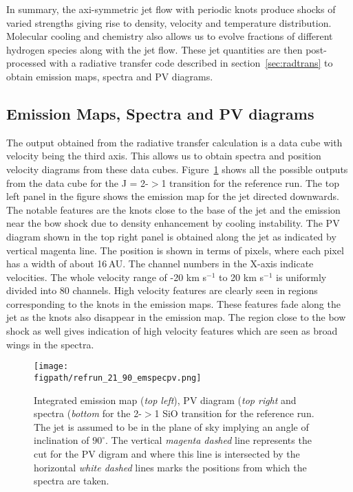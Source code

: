 \documentclass[useAMS,usenatbib]{mn2e}
\newcommand{\figpath}{PFIGS/}
\begin{document}
In summary, the axi-symmetric jet flow with periodic knots 
produce shocks of varied strengths giving rise to density, velocity and
temperature distribution. Molecular cooling and chemistry also 
allows us to evolve fractions of different hydrogen species along with the jet
flow. These jet quantities are then post-processed with a radiative
transfer code described in section~\ref{sec:radtrans} to obtain emission maps,
spectra and PV diagrams.



\subsection{Emission Maps, Spectra and PV diagrams}
\label{ssec:emspecpv}
The output obtained from the radiative transfer calculation is a data
cube with velocity being the third axis. This allows us to obtain
spectra and position velocity diagrams from these data cubes. 
Figure~\ref{empvspec90} shows all the possible outputs from the data
cube for the J = 2-$>$1 transition for the reference run. 
The top left panel in the figure shows the emission map for the jet
directed downwards. The notable features are the knots close to the
base of the jet and the emission near the bow shock due to density
enhancement by cooling instability. The PV diagram shown in the top
right panel is obtained along the jet as indicated by vertical magenta
line. The position is shown in terms of pixels, where each pixel has a
width of about 16\,AU. The channel numbers in the X-axis indicate
velocities. The whole velocity range of -20 km s$^{-1}$ to 20 km
s$^{-1}$ is uniformly divided into 80 channels. High velocity features
are clearly seen in regions corresponding to the knots in the emission
maps. These features fade along the jet as the knots also disappear in
the emission map. The region close to the bow shock as well gives
indication of high velocity features which are seen as broad wings in
the spectra. 
%

\begin{figure}
 \texttt{[image: \\figpath/refrun\_21\_90\_emspecpv.png]}
 \caption{Integrated emission map ({\it top left}), PV diagram ({\it top right}
   and spectra ({\it bottom} for the
   2-$>$1 SiO transition for the reference run. 
   The jet is assumed to be in the plane of sky implying an angle of
   inclination of $90^{\circ}$. The vertical {\it magenta dashed} line represents the cut for the PV digram and where this line is intersected by the horizontal
 {\it white dashed} lines marks the positions from which the spectra are taken.} 
\label{empvspec90}
\end{figure}
\end{document}
